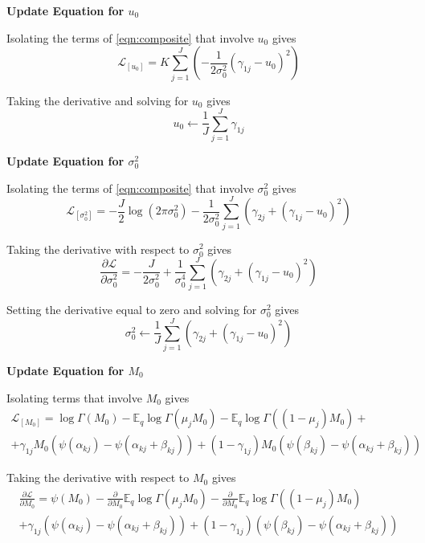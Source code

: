 \documentclass[10pt, letterpaper]{article}
\newcommand{\E}{\mathbb{E}}
\begin{document}
{\bf Update Equation for $u_0$ }

Isolating the terms of \eqref{eqn:composite} that involve $u_0$ gives
\begin{equation*}
\mathcal{L}_{[u_0]} = K\sum_{j=1}^J\left(-\frac{1}{2\sigma_0^2}(\gamma_{1j}-u_0)^2\right)
\end{equation*}

Taking the derivative and solving for $u_0$ gives
\begin{equation}
u_0 \leftarrow \frac{1}{J}\sum_{j=1}^J \gamma_{1j} 
\end{equation}

{\bf Update Equation for $\sigma_0^2$ }

Isolating the terms of \eqref{eqn:composite} that involve $\sigma^2_0$ gives
\begin{equation*}
\mathcal{L}_{[\sigma^2_0]} = -\frac{J}{2}\log(2\pi\sigma^2_0) -\frac{1}{2\sigma_0^2}\sum_{j=1}^J\left(\gamma_{2j} + (\gamma_{1j}-u_0)^2 \right)
\end{equation*}

Taking the derivative with respect to $\sigma^2_0$ gives
\begin{equation*}
\frac{\partial \mathcal{L}}{\partial \sigma^2_0} = -\frac{J}{2\sigma^2_0} +\frac{1}{\sigma^4_0}\sum_{j=1}^J\left(\gamma_{2j} + (\gamma_{1j}-u_0)^2\right)
\end{equation*}

Setting the derivative equal to zero and solving for $\sigma^2_0$ gives
\begin{equation}
\sigma^2_0 \leftarrow \frac{1}{J}\sum_{j=1}^J\left(\gamma_{2j} + (\gamma_{1j}-u_0)^2\right)
\end{equation}

{\bf Update Equation for $M_0$ }

Isolating terms that involve $M_0$ gives
\begin{multline*}
\mathcal{L}_{[M_0]} = \log \Gamma(M_0) -\E_q\log \Gamma(\mu_jM_0) -\E_q\log \Gamma((1-\mu_j)M_0) +\\
+\gamma_{1j}M_0(\psi(\alpha_{kj})-\psi(\alpha_{kj}+\beta_{kj})) +(1-\gamma_{1j})M_0(\psi(\beta_{kj})-\psi(\alpha_{kj}+\beta_{kj}))
\end{multline*}

Taking the derivative with respect to $M_0$ gives
\begin{multline*}
\frac{\partial \mathcal{L}}{\partial M_0} = \psi(M_0) -\frac{\partial}{\partial M_0}\E_q\log \Gamma(\mu_jM_0)
-\frac{\partial}{\partial M_0}\E_q\log \Gamma((1-\mu_j)M_0) \\
+\gamma_{1j}(\psi(\alpha_{kj})-\psi(\alpha_{kj}+\beta_{kj})) 
+(1-\gamma_{1j})(\psi(\beta_{kj})-\psi(\alpha_{kj}+\beta_{kj}))
\end{multline*}
\end{document}
